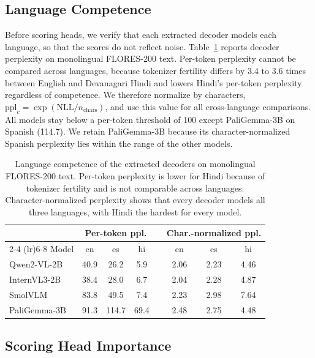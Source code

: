 \documentclass[10pt]{article}
\begin{document}
\subsection{Language Competence}
\label{sec:competence}

Before scoring heads, we verify that each extracted decoder models each language, so that the scores do not reflect noise. Table~\ref{tab:competence} reports decoder perplexity on monolingual FLORES-200 text. Per-token perplexity cannot be compared across languages, because tokenizer fertility differs by 3.4 to 3.6 times between English and Devanagari Hindi and lowers Hindi's per-token perplexity regardless of competence. We therefore normalize by characters, $\mathrm{ppl}_c = \exp(\mathrm{NLL}/n_{\mathrm{chars}})$, and use this value for all cross-language comparisons. All models stay below a per-token threshold of 100 except PaliGemma-3B on Spanish (114.7). We retain PaliGemma-3B because its character-normalized Spanish perplexity lies within the range of the other models.

\begin{table}[t]
\centering
\caption{Language competence of the extracted decoders on monolingual FLORES-200 text. Per-token perplexity is lower for Hindi because of tokenizer fertility and is not comparable across languages. Character-normalized perplexity shows that every decoder models all three languages, with Hindi the hardest for every model.}
\label{tab:competence}
\begin{tabular}{l ccc c ccc}
\toprule
& \multicolumn{3}{c}{Per-token ppl.} && \multicolumn{3}{c}{Char.-normalized ppl.} \\
\cmidrule(lr){2-4} \cmidrule(lr){6-8}
Model & en & es & hi && en & es & hi \\
\midrule
Qwen2-VL-2B  & 40.9 & 26.2  & 5.9  && 2.06 & 2.23 & 4.46 \\
InternVL3-2B & 38.4 & 28.0  & 6.7  && 2.04 & 2.28 & 4.87 \\
SmolVLM      & 83.8 & 49.5  & 7.4  && 2.23 & 2.98 & 7.64 \\
PaliGemma-3B & 91.3 & 114.7 & 69.4 && 2.48 & 2.75 & 4.48 \\
\bottomrule
\end{tabular}
\end{table}

\subsection{Scoring Head Importance}
\label{sec:lahis}
\end{document}

